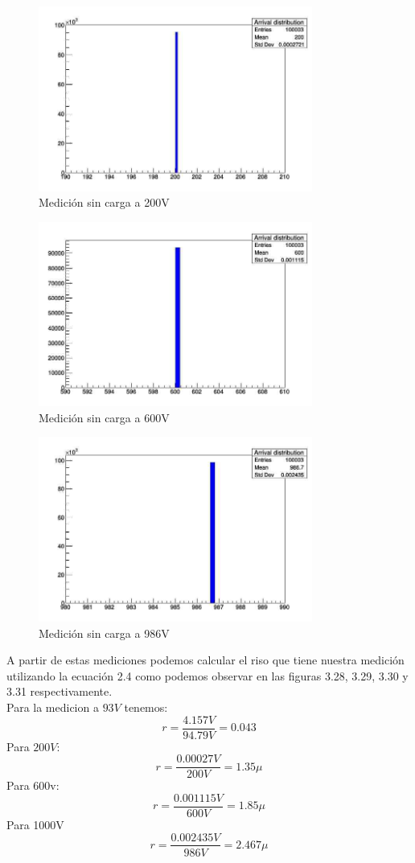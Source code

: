 \begin{figure}[H]
\centering
\includegraphics[width=9cm]{Capitulo3/figs/200V.jpg}
\caption{Medición sin carga a 200V}
\end{figure}

\begin{figure}[H]
\centering
\includegraphics[width=9cm]{Capitulo3/figs/600v.jpg}
\caption{Medición sin carga a 600V}
\end{figure}

\begin{figure}[H]
\centering
\includegraphics[width=9cm]{Capitulo3/figs/986V.jpg}
\caption{Medición sin carga a 986V}
\end{figure}

A partir de estas mediciones podemos calcular el riso que tiene nuestra medición utilizando la ecuación 2.4 como podemos observar en las figuras 3.28, 3.29, 3.30 y 3.31  respectivamente. \\Para la medicion a $93V$ tenemos: $$r=\frac{4.157V}{94.79V}=0.043$$ Para $200V$: $$r=\frac{0.00027V}{200V}=1.35\mu $$ Para 600v:  $$r=\frac{0.001115V}{600V}=1.85\mu $$ Para 1000V  $$r=\frac{0.002435V}{986V}=2.467\mu $$

